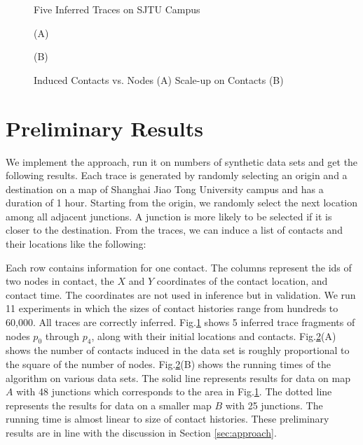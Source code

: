 \begin{figure}[th]
\centering
{}
\caption{Five Inferred Traces on SJTU Campus}
\label{fig:sjtu}
\end{figure}

\begin{figure}
\begin{minipage}[th]{0.48\columnwidth}
\centering
{}
{\small(A)}
\end{minipage}
\hfill
\begin{minipage}[th]{0.48\columnwidth}
\centering
{}
{\small(B)}
\end{minipage}
\caption{Induced Contacts vs. Nodes (A)
Scale-up on Contacts (B)}
\label{fig:scale}
\end{figure}

\section{Preliminary Results}
We implement the approach, run it on numbers of synthetic data sets 
and get the following results. 
Each trace is generated by randomly selecting an origin
and a destination on a map of Shanghai Jiao Tong University
campus and has a duration of 1 hour. Starting from the origin, we randomly
select the next location among all adjacent junctions. A junction 
is more likely to be selected if it is closer to the destination. 
From the traces, we can induce a list of contacts and their locations like the following:
\begin{center}
\end{center}
Each row contains information for one contact. 
The columns represent the ids of two nodes in contact, 
the $X$ and $Y$ coordinates
of the contact location, and contact time. The coordinates are
not used in inference but in validation.
We run 11 experiments in which the sizes of contact histories 
range from hundreds to 60,000. 
All traces are correctly inferred.
Fig.\ref{fig:sjtu} shows 5 inferred trace fragments of nodes
$p_0$ through $p_4$, 
along with their initial locations and contacts. 
Fig.\ref{fig:scale}(A) shows the number of contacts induced in the
data set is roughly proportional to the square of the number of nodes. 
Fig.\ref{fig:scale}(B) shows the running times of the
algorithm on various data sets. 
The solid line represents results for data on map $A$ 
with 48 junctions which corresponds to the area in Fig.\ref{fig:sjtu}. 
The dotted line represents the results for data on a smaller 
map $B$ with 25 junctions. 
The running time is almost linear to size of contact histories.
These preliminary results are in line with the discussion in Section \ref{sec:approach}.


